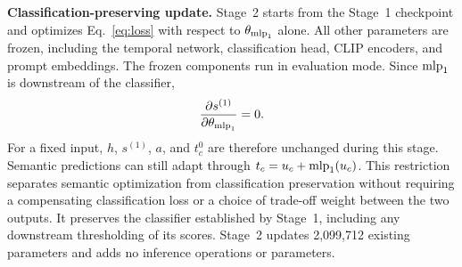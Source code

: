 \textbf{Classification-preserving update.}
Stage~2 starts from the Stage~1 checkpoint and optimizes Eq.~\eqref{eq:loss} with respect to $\theta_{\mathrm{mlp}_1}$ alone. All other parameters are frozen, including the temporal network, classification head, CLIP encoders, and prompt embeddings. The frozen components run in evaluation mode. Since $\mathrm{mlp}_1$ is downstream of the classifier,
\begin{equation}
 \frac{\partial s^{(1)}}{\partial\theta_{\mathrm{mlp}_1}}=0.
 \label{eq:invariance}
\end{equation}
For a fixed input, $h$, $s^{(1)}$, $a$, and $t_c^0$ are therefore unchanged during this stage. Semantic predictions can still adapt through $t_c=u_c+\mathrm{mlp}_1(u_c)$. This restriction separates semantic optimization from classification preservation without requiring a compensating classification loss or a choice of trade-off weight between the two outputs. It preserves the classifier established by Stage~1, including any downstream thresholding of its scores. Stage~2 updates 2,099,712 existing parameters and adds no inference operations or parameters.
